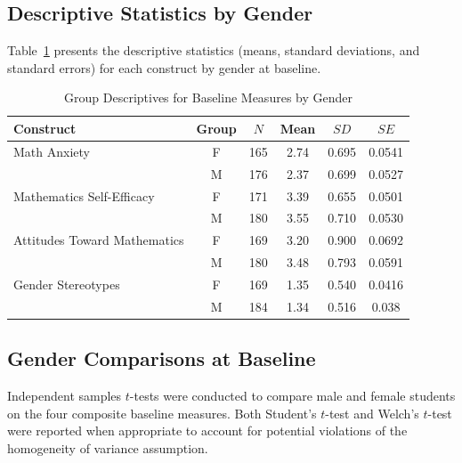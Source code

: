 \subsection{Descriptive Statistics by Gender}
Table~\ref{tab:descriptives_baseline} presents the descriptive statistics (means, standard deviations, and standard errors) for each construct by gender at baseline.
\begin{table}[htbp]
\centering
\caption{Group Descriptives for Baseline Measures by Gender}
\label{tab:descriptives_baseline}
\vspace{0.3cm}
\renewcommand{\arraystretch}{1.2}

\begin{tabular}{lccccc}
\toprule
Construct & Group & $N$ & Mean & $SD$ & $SE$ \\
\midrule

Math Anxiety & F & 165 & 2.74 & 0.695 & 0.0541 \\
               & M & 176 & 2.37 & 0.699 & 0.0527 \\

\addlinespace

Mathematics Self-Efficacy & F & 171 & 3.39 & 0.655 & 0.0501 \\
                          & M & 180 & 3.55 & 0.710 & 0.0530 \\

\addlinespace

Attitudes Toward Mathematics & F & 169 & 3.20 & 0.900 & 0.0692 \\
                             & M & 180 & 3.48 & 0.793 & 0.0591 \\

\addlinespace

Gender Stereotypes & F & 169 & 1.35 & 0.540 & 0.0416 \\
                    & M & 184 & 1.34 & 0.516 & 0.038 \\

\bottomrule
\end{tabular}
\end{table}

\subsection{Gender Comparisons at Baseline}
Independent samples $t$-tests were conducted to compare male and female students on the four composite baseline measures. Both Student's $t$-test and Welch's $t$-test were reported when appropriate to account for potential violations of the homogeneity of variance assumption.

